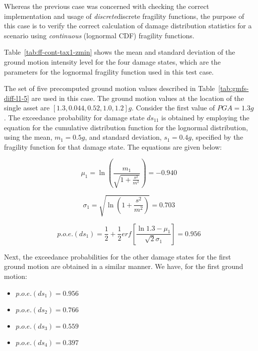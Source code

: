 Whereas the previous case was concerned with checking the correct implementation and usage of \emph{discrete}discrete fragility functions, the purpose of this case is to verify the correct calculation of damage distribution statistics for a scenario using \emph{continuous} (lognormal CDF) fragility functions.



Table~\ref{tab:ff-cont-tax1-zmin} shows the mean and standard deviation of the ground motion intensity level for the four damage states, which are the parameters for the lognormal fragility function used in this test case.

The set of five precomputed ground motion values described in Table~\ref{tab:gmfs-diff-l1-5}  are used in this case. The ground motion values at the location of the single asset are $[1.3, 0.044, 0.52, 1.0, 1.2] g$. Consider the first value of $PGA = 1.3 g$. The exceedance probability for damage state $ds_11$ is obtained by employing the equation for the cumulative distribution function for the lognormal distribution, using the mean, $m_1 = 0.5 g$, and standard deviation, $s_1 = 0.4 g$, specified by the fragility function for that damage state. The equations are given below:

\begin{equation}
	\mu_1 = \ln \left( \frac{m_1}{\sqrt{1 + \frac{s^2}{m^2}}} \right) = -0.940
\end{equation}

\begin{equation}
	\sigma_1 = \sqrt{\ln \left( 1 + \frac{s^2}{m^2} \right)} = 0.703
\end{equation}

\begin{equation}
	p.o.e.(ds_1) = \frac{1}{2} + \frac{1}{2} erf \left[ \frac{\ln 1.3 - \mu_1}{\sqrt{2} \sigma_1} \right] = 0.956
\end{equation}

Next, the exceedance probabilities for the other damage states for the first ground motion are obtained in a similar manner. We have, for the first ground motion:

\begin{itemize}
	\item $p.o.e.(ds_1) = 0.956$
	\item $p.o.e.(ds_2) = 0.766$
	\item $p.o.e.(ds_3) = 0.559$
	\item $p.o.e.(ds_4) = 0.397$
\end{itemize}

